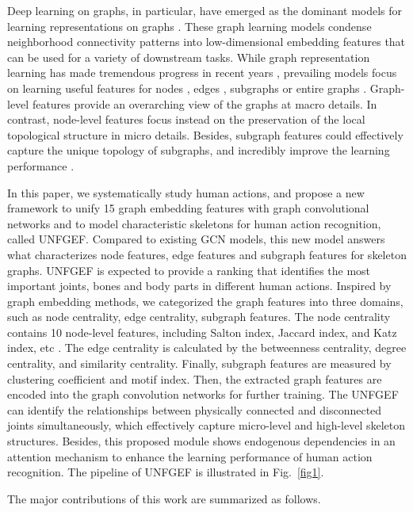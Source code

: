 \documentclass[journal]{IEEEtran}
\begin{document}
Deep learning on graphs, in particular, have emerged as the
dominant models for learning representations on graphs \cite{kipf2016semi}. These graph learning models condense
neighborhood connectivity patterns into low-dimensional embedding features that can be used for a variety
of downstream tasks. While graph representation learning has made tremendous progress
in recent years \cite{wu2019simplifying}, prevailing models focus on learning useful features for nodes \cite{adhikari2018sub2vec}, edges \cite{vashishth2019composition}, subgraphs \cite{monti2018motifnet} or entire graphs \cite{pareja2020evolvegcn}. Graph-level features provide an overarching view of the graphs at macro details. In contrast, node-level features focus instead on the preservation of the local topological structure in micro details. Besides, subgraph features could effectively capture the unique topology of subgraphs, and incredibly improve the learning performance \cite{alsentzer2020subgraph}.

In this paper, we systematically study human actions, and propose a new framework to unify 15 graph embedding features with graph convolutional networks and to model characteristic skeletons for human action recognition, called UNFGEF. Compared to existing GCN models, this new model answers what characterizes node features, edge features and subgraph features for skeleton graphs. UNFGEF is expected to provide a ranking that identifies the most important joints, bones and body parts in different human actions. Inspired by graph embedding methods, we categorized the graph features into three domains, such as node centrality, edge centrality, subgraph features. The node centrality contains 10 node-level features, including Salton index, Jaccard index, and Katz index, etc \cite{fu2018link}. The edge centrality is calculated by the betweenness centrality, degree centrality, and similarity centrality. Finally, subgraph features are measured by clustering coefficient and motif index. Then, the extracted graph features are encoded into the graph convolution networks for further training. The UNFGEF can identify the relationships between physically connected and disconnected joints simultaneously, which effectively capture micro-level and high-level skeleton structures. Besides, this proposed module shows endogenous dependencies in an attention mechanism to enhance the learning performance of human action recognition. The pipeline of UNFGEF is illustrated in Fig.~\ref{fig1}.

The major contributions of this work are summarized as follows.
\end{document}
